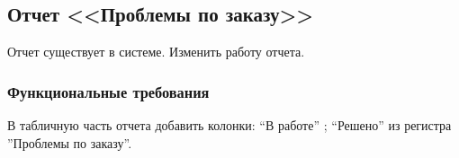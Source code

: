 \subsection{Отчет <<Проблемы по заказу>>}
\label{rep:Rep_Problems}
\renewcommand{\curobject}{<<Проблемы по заказу>>}

Отчет существует в системе. Изменить работу отчета.

\subsubsection{Функциональные требования}


В табличную часть отчета добавить колонки:  “В работе” ; “Решено” из регистра 
''Проблемы по заказу''.